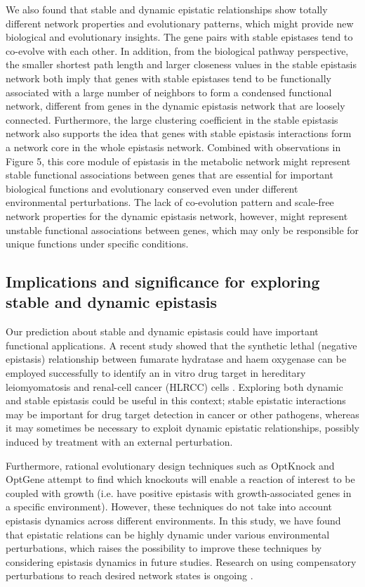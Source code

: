 We also found that stable and dynamic epistatic relationships show
totally different network properties and evolutionary patterns, which
might provide new biological and evolutionary insights. The gene pairs
with stable epistases tend to co-evolve with each other. In addition,
from the biological pathway perspective, the smaller shortest path
length and larger closeness values in the stable epistasis network
both imply that genes with stable epistases tend to be functionally
associated with a large number of neighbors to form a condensed
functional network, different from genes in the dynamic epistasis
network that are loosely connected. Furthermore, the large clustering
coefficient in the stable epistasis network also supports the idea
that genes with stable epistasis interactions form a network core in
the whole epistasis network. Combined with observations in Figure 5,
this core module of epistasis in the metabolic network might represent
stable functional associations between genes that are essential for
important biological functions and evolutionary conserved even under
different environmental perturbations. The lack of co-evolution
pattern and scale-free network properties for the dynamic epistasis
network, however, might represent unstable functional associations
between genes, which may only be responsible for unique functions
under specific conditions.

\subsection{Implications and significance for exploring stable and
dynamic epistasis}

Our prediction about stable and dynamic epistasis could have important
functional applications. A recent study showed that the synthetic
lethal (negative epistasis) relationship between fumarate hydratase
and haem oxygenase can be employed successfully to identify an in
vitro drug target in hereditary leiomyomatosis and renal-cell cancer
(HLRCC) cells \citep{Frezza2011}. Exploring both dynamic and stable
epistasis could be useful in this context; stable epistatic
interactions may be
important for drug target detection in cancer or other pathogens,
whereas it may sometimes be necessary to exploit dynamic epistatic
relationships, possibly induced by treatment with an external
perturbation.

Furthermore, rational evolutionary design techniques such as OptKnock
\citep{Burgard2003} and OptGene \citep{Patil2005} attempt to find
which knockouts will enable a reaction of interest to be coupled with
growth (i.e. have positive
epistasis with growth-associated genes in a specific
environment). However, these techniques do not take into account
epistasis dynamics across different environments. In this study, we
have found that epistatic relations can be highly dynamic under
various environmental perturbations, which raises the possibility to
improve these techniques by considering epistasis dynamics in future
studies. Research on using compensatory perturbations to reach desired
network states is ongoing \citep{Cornelius2011}.

